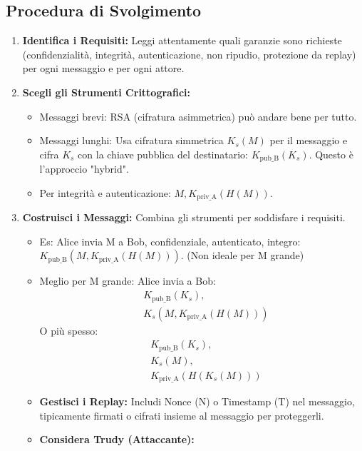 \subsection{Procedura di Svolgimento}
\begin{enumerate}[label=\arabic*.]
    \item \textbf{Identifica i Requisiti:} Leggi attentamente quali garanzie sono richieste (confidenzialità, integrità, autenticazione, non ripudio, protezione da replay) per ogni messaggio e per ogni attore.
    \item \textbf{Scegli gli Strumenti Crittografici:}
    \begin{itemize}
        \item Messaggi brevi: RSA (cifratura asimmetrica) può andare bene per tutto.
        \item Messaggi lunghi: Usa cifratura simmetrica $K_s(M)$ per il messaggio e cifra $K_s$ con la chiave pubblica del destinatario: $K_{\text{pub\_B}}(K_s)$. Questo è l'approccio "hybrid".
        \item Per integrità e autenticazione: $M, K_{\text{priv\_A}}(H(M))$.
    \end{itemize}
    \item \textbf{Costruisci i Messaggi:} Combina gli strumenti per soddisfare i requisiti.
    \begin{itemize}
        \item Es: Alice invia M a Bob, confidenziale, autenticato, integro: $K_{\text{pub\_B}}( M, K_{\text{priv\_A}}(H(M)) )$. (Non ideale per M grande)
        \item Meglio per M grande: Alice invia a Bob:
        \begin{align*}
            &K_{\text{pub\_B}}(K_s), \\
            &K_s(M, K_{\text{priv\_A}}(H(M)))
        \end{align*}
        O più spesso:
        \begin{align*}
            &K_{\text{pub\_B}}(K_s), \\
            &K_s(M), \\
            &K_{\text{priv\_A}}(H( K_s(M) ))
        \end{align*}
    \item \textbf{Gestisci i Replay:} Includi Nonce (N) o Timestamp (T) nel messaggio, tipicamente firmati o cifrati insieme al messaggio per proteggerli.
    \item \textbf{Considera Trudy (Attaccante):}
    \begin{itemize}

\end{itemize}
\end{itemize}
\end{enumerate}
